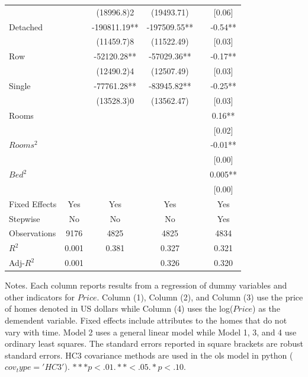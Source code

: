 \documentclass[12pt]{report}
\begin{document}
\begin{table}[h!]
\begin{threeparttable}
\begin{tabular}{lccccc}
&	&	\footnotesize(18996.8)2&	\footnotesize(19493.71)&&	\footnotesize[0.06] \\
Detached&	&	-190811.19\footnotesize***& -197509.55\footnotesize***&&	-0.54\footnotesize*** \\
&	&	\footnotesize(11459.7)8&	\footnotesize(11522.49)&&	\footnotesize[0.03] \\
Row&	 &	-52120.28\footnotesize***&	-57029.36\footnotesize***&& 	-0.17\footnotesize*** \\
&	&	\footnotesize(12490.2)4&	\footnotesize(12507.49)&&	\footnotesize[0.03] \\
Single&	&	-77761.28\footnotesize***&	-83945.82\footnotesize***&&	-0.25\footnotesize*** \\
&	&	\footnotesize(13528.3)0&	\footnotesize(13562.47)&&	\footnotesize[0.03]\\
Rooms&	&	&	&&	0.16\footnotesize***\\
&	&	&	&&	\footnotesize[0.02] \\
$Rooms^2$&	&	&	&&	-0.01\footnotesize*** \\
&	&	&	&&	\footnotesize[0.00] \\
$Bed^2$&	&	&	&&	0.005\footnotesize*** \\
&	&	&&	&	\footnotesize[0.00] \\
Fixed Effects &       Yes&             Yes &                  Yes &  &                       Yes    \\ [0.5ex]
Stepwise &       No&             No &                   No &  &                      Yes    \\ [0.5ex]
Observations&            9176 &           4825&                  4825   &&                         4834      \\ [0.5ex]
$R^2$ &                     0.001 &          0.381&                   0.327 &&                      0.321 \\ [0.5ex]
Adj-$R^2$&                 0.001&        &                  0.326 &  &                   0.320   \\ [0.5ex]
\hline
\bottomrule
\end{tabular}
\begin{tablenotes}
  
 \item \footnotesize{Notes. Each column reports results from a regression of dummy variables and other indicators for $Price$. Column (1),  Column (2), and Column (3) use the price of homes denoted in US dollars while Column (4) uses the log($Price$) as the demendent variable. Fixed effects include attributes to the homes that do not vary with time. Model 2 uses a general linear model while Model 1, 3, and 4 use ordinary least squares. The standard errors reported in square brackets  are robust standard errors. HC3 covariance methods are used in the ols model in python ($cov_type='HC3'$). $***p<.01. **<.05. *p<.10.$}

\end{tablenotes}
\label{table:5}
\end{threeparttable}
\end{table}
\clearpage
\end{document}
